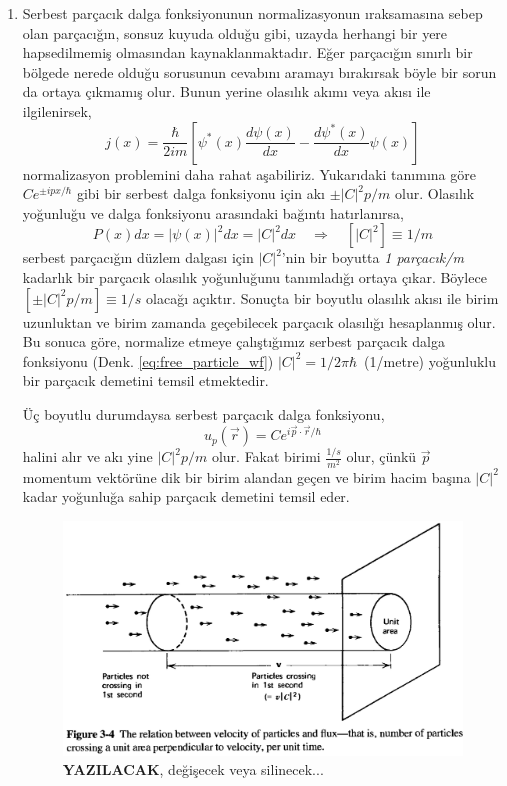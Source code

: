 \documentclass[a4paper,12pt, twoside]{article}
\newcommand{\YAZILACAK}{{\vspace{18pt}\bf\Large \color{red} YAZILACAK}}
\begin{document}
\begin{enumerate}
	\item Serbest parçacık dalga fonksiyonunun normalizasyonun ıraksamasına sebep olan parçacığın, sonsuz kuyuda olduğu gibi, uzayda herhangi bir yere hapsedilmemiş olmasından kaynaklanmaktadır. Eğer parçacığın sınırlı bir bölgede nerede olduğu sorusunun cevabını aramayı bırakırsak böyle bir sorun da ortaya çıkmamış olur. Bunun yerine olasılık akımı veya akısı ile ilgilenirsek,
	\begin{equation}
	j ( x ) = \frac { \hbar } { 2 i m } \left[ \psi^\ast ( x ) \frac { d \psi ( x ) } { d x } - \frac { d \psi ^ { \ast } ( x ) } { d x } \psi ( x ) \right]
	\end{equation}
	normalizasyon problemini daha rahat aşabiliriz. Yukarıdaki tanımına göre $C e ^ {\pm i p x / \hbar }$ gibi bir serbest dalga fonksiyonu için akı $\pm | C | ^ { 2 } p / m$ olur. Olasılık yoğunluğu ve dalga fonksiyonu arasındaki bağıntı hatırlanırsa,
	\begin{equation}
	P(x) dx = |\psi(x)|^2 dx = |C|^2 dx \quad \Rightarrow \quad [|C|^2]\equiv 1/m
	\end{equation}
	serbest parçacığın düzlem dalgası için $|C|^2$'nin bir boyutta \emph{1 parçacık/m} kadarlık bir parçacık olasılık yoğunluğunu tanımladığı ortaya çıkar. Böylece $[\pm | C | ^ { 2 } p / m] \equiv 1/s$ olacağı açıktır. Sonuçta bir boyutlu olasılık akısı ile birim uzunluktan ve birim zamanda geçebilecek parçacık olasılığı hesaplanmış olur. Bu sonuca göre, normalize etmeye çalıştığımız serbest parçacık dalga fonksiyonu (Denk. 	\ref{eq:free_particle_wf}) $|C|^2 = 1 / 2 \pi \hbar$~(1/metre) yoğunluklu bir parçacık demetini temsil etmektedir.
	
	Üç boyutlu durumdaysa serbest parçacık dalga fonksiyonu,
	\begin{equation}
	u _ { p } ( \vec{ r } ) = C e ^ { i \vec { p } \cdot \vec { r } / \hbar }
	\end{equation}
	halini alır ve akı yine $|C|^2 p/m$ olur. Fakat birimi $\frac{1/s}{m^2}$ olur, çünkü $\vec p$ momentum vektörüne dik bir birim alandan geçen ve birim hacim başına $|C|^2$ kadar yoğunluğa sahip parçacık demetini temsil eder.
	\begin{figure}[hbtp]
		\centering
		\includegraphics[width=0.5\linewidth]{figurler/normalization_and_probab_flux}
		\caption{\YAZILACAK, değişecek veya silinecek...}
		\label{fig:normalizationandprobabflux}
	\end{figure}
	
	
	
\end{enumerate}
\end{document}
